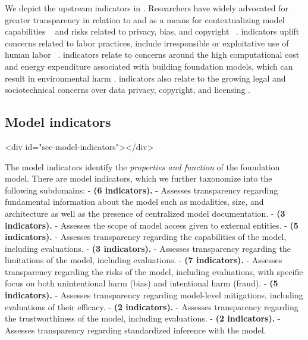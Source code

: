 \documentclass[screen, authorversion, acmsmall]{acmart}
\begin{document}
\noindent We depict the upstream indicators in .
Researchers have widely advocated for greater transparency in relation to \data and \dataaccess \citep{bender-friedman-2018-data, gebru2018datasheets, hutchinson2021towards, dodge2021c4, bandy2021addressing} as a means for contextualizing model capabilities ~\citep{sambasivan2021everyone, longpre2023pretrainer} and risks related to privacy, bias, and copyright ~\citep{buolamwini2018gender,bender2021dangers, kandpal2022deduplicating,sobel2017artificial}.
\labor indicators uplift concerns related to labor practices, include irresponsible or exploitative use of human labor ~\citep{gray2019ghost, crawford2021atlas, hao2023cleaning, kittur2013future, dzieza2023ai, west2019data}.
\compute indicators relate to concerns around the high computational cost and energy expenditure associated with building foundation models, which can result in environmental harm \citep{lacoste2019quantifying,strubell2019energy,schwartz2020green,patterson2021carbon,bender2021dangers,henderson2020towards,luccioni2023counting,vipra2023comments}.
\datamitigations indicators also relate to the growing legal and sociotechnical concerns over data privacy, copyright, and licensing \citep{henderson2023foundation, brown2022does, lee2023talkin,genlaw2023,tremblay2023openai}.

\hypertarget{model-indicators}{\subsection{Model indicators}}
<div id="sec-model-indicators"></div>

The model indicators identify the \emph{properties and function} of the foundation model. 
There are \nummodelindicators model indicators, which we further taxonomize into the following \nummodelsubdomains subdomains:
-  \textbf{\modelbasics (6 indicators).}
- Assesses transparency regarding fundamental information about the model such as modalities, size, and architecture as well as the presence of centralized model documentation.
-  \textbf{\modelaccess (3 indicators).}
- Assesses the scope of model access given to external entities.
-  \textbf{\capabilities (5 indicators).}
- Assesses transparency regarding the capabilities of the model, including evaluations.
-  \textbf{\limitations (3 indicators).}
- Assesses transparency regarding the limitations of the model, including evaluations.
-  \textbf{\risks (7 indicators).}
- Assesses transparency regarding the risks of the model, including evaluations, with specific focus on both unintentional harm (\eg bias) and intentional harm (\eg fraud).
-  \textbf{\modelmitigations (5 indicators).}
- Assesses transparency regarding model-level mitigations, including evaluations of their efficacy.
-  \textbf{\trustworthiness (2 indicators).}
- Assesses transparency regarding the trustworthiness of the model, including evaluations.
-  \textbf{\inference (2 indicators).}
- Assesses transparency regarding standardized inference with the model.
\end{document}
